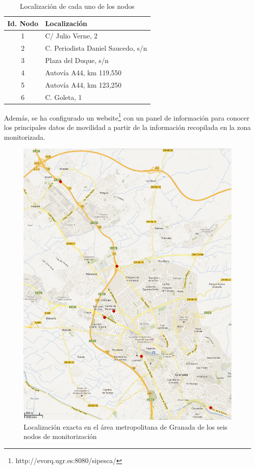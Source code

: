 \documentclass[twocolumn,twoside]{Jornadas}
\begin{document}
 \begin{table}
 \caption{Localización de cada uno de los nodos
 \label{localizaciones}}
 \begin{center}
 \begin{tabular}{|c|l|}
 \hline
Id. Nodo  &  Localización      \\
 \hline
    1     &  C/ Julio Verne, 2    \\
 \hline
    2     &  C. Periodista Daniel Saucedo, s/n    \\
 \hline
    3     &  Plaza del Duque, s/n    \\
 \hline
    4     &  Autovía A44, km 119,550    \\
 \hline
    5     &  Autovía A44, km 123,250    \\
 \hline
    6     &  C. Goleta, 1    \\
 \hline
 \end{tabular}
 \end{center}
 \end{table}

Además, se ha configurado un website\footnote{http://evorq.ugr.es:8080/sipesca/} con un panel de información para conocer los principales datos de movilidad a partir de la información recopilada en la zona monitorizada.


\begin{figure}[htpb] 
\begin{center} 
\includegraphics[scale=0.40]{mapa.png}
\end{center} 
\caption{Localización exacta en el área metropolitana de Granada de los seis nodos de monitorización} 
\label{mapa} 
\end{figure}
\end{document}
